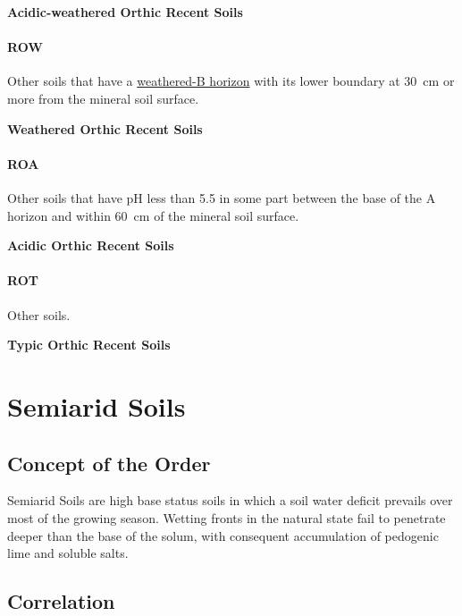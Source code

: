 \documentclass[
  letterpaper,
  DIV=11,
  numbers=noendperiod]{scrreprt}
\begin{document}
\textbf{Acidic-weathered Orthic Recent Soils}

\hypertarget{sec-key-ROW}{%
\subsubsection{\texorpdfstring{\textbf{ROW}}{ROW}}\label{sec-key-ROW}}

Other soils that have a \protect\hyperlink{sec-diag-bw}{weathered-B
horizon} with its lower boundary at 30~cm or more from the mineral soil
surface.

\textbf{Weathered Orthic Recent Soils}

\hypertarget{sec-key-ROA}{%
\subsubsection{\texorpdfstring{\textbf{ROA}}{ROA}}\label{sec-key-ROA}}

Other soils that have pH less than 5.5 in some part between the base of
the A horizon and within 60~cm of the mineral soil surface.

\textbf{Acidic Orthic Recent Soils}

\hypertarget{sec-key-ROT}{%
\subsubsection{\texorpdfstring{\textbf{ROT}}{ROT}}\label{sec-key-ROT}}

Other soils.

\textbf{Typic Orthic Recent Soils}


\hypertarget{sec-ord-S}{%
\chapter{Semiarid Soils}\label{sec-ord-S}}

\hypertarget{sec-con-S}{%
\section{Concept of the Order}\label{sec-con-S}}

Semiarid Soils are high base status soils in which a soil water deficit
prevails over most of the growing season. Wetting fronts in the natural
state fail to penetrate deeper than the base of the solum, with
consequent accumulation of pedogenic lime and soluble salts.

\hypertarget{sec-cor-S}{%
\section{Correlation}\label{sec-cor-S}}
\end{document}
